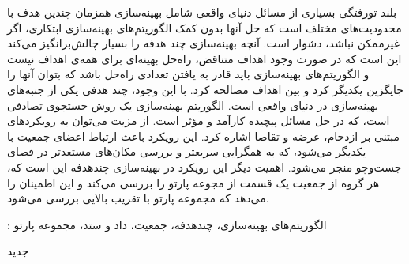 


\pagestyle{empty}

\begin{وسط‌چین}
\end{وسط‌چین}


‌بلند
‌تورفتگی بسیاری از مسائل دنیای واقعی شامل بهینه‌سازی همزمان چندین هدف با محدودیت‌های مختلف است که حل آنها بدون کمک الگوریتم‌های بهینه‌سازی ابتکاری، اگر غیرممکن نباشد، دشوار است. آنچه بهینه‌سازی چند هدفه را بسیار چالش‌برانگیز می‌کند این است که در صورت وجود اهداف متناقض، راه‌حل بهینه‌ای برای همه‌ی اهداف نیست و الگوریتم‌های بهینه‌سازی باید قادر به یافتن تعدادی راه‌حل باشد که بتوان آنها را جایگزین یکدیگر کرد و بین اهداف مصالحه کرد.  با این وجود، چند هدفی یکی از جنبه‌های بهینه‌سازی در دنیای واقعی است.
الگوریتم بهینه‌سازی  یک روش جستجوی تصادفی است، که در حل مسائل پیچیده کارآمد و مؤثر است.
از مزیت   می‌توان به رویکردهای مبتنی بر ازدحام، عرضه و تقاضا اشاره کرد. این رویکرد باعث ارتباط اعضای جمعیت با یکدیگر می‌شود، که به همگرایی سریعتر و بررسی مکان‌های مستعدتر در فصای جست‌وچو منجر می‌شود. اهمیت دیگر این رویکرد در بهینه‌سازی چندهدفه این است که، هر گروه از جمعیت یک قسمت از مجوعه پارتو را بررسی می‌کند و این اطمینان را می‌دهد که مجموعه پارتو با تقریب بالایی بررسی می‌شود.

 : 
 الگوریتم‌های بهینه‌سازی، چندهدفه، جمعیت، داد و ستد، مجموعه پارتو

‌جدید

